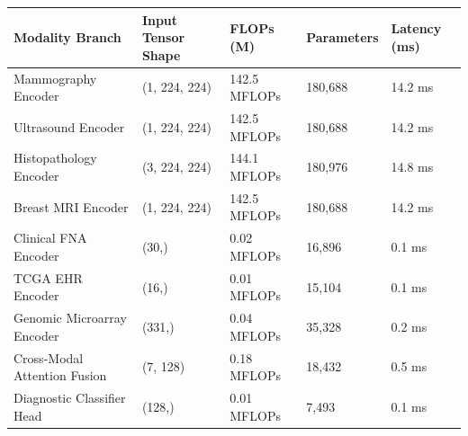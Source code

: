 \begin{tabular}{lllll}
\toprule
Modality Branch & Input Tensor Shape & FLOPs (M) & Parameters & Latency (ms) \\
\midrule
Mammography Encoder & (1, 224, 224) & 142.5 MFLOPs & 180,688 & 14.2 ms \\
Ultrasound Encoder & (1, 224, 224) & 142.5 MFLOPs & 180,688 & 14.2 ms \\
Histopathology Encoder & (3, 224, 224) & 144.1 MFLOPs & 180,976 & 14.8 ms \\
Breast MRI Encoder & (1, 224, 224) & 142.5 MFLOPs & 180,688 & 14.2 ms \\
Clinical FNA Encoder & (30,) & 0.02 MFLOPs & 16,896 & 0.1 ms \\
TCGA EHR Encoder & (16,) & 0.01 MFLOPs & 15,104 & 0.1 ms \\
Genomic Microarray Encoder & (331,) & 0.04 MFLOPs & 35,328 & 0.2 ms \\
Cross-Modal Attention Fusion & (7, 128) & 0.18 MFLOPs & 18,432 & 0.5 ms \\
Diagnostic Classifier Head & (128,) & 0.01 MFLOPs & 7,493 & 0.1 ms \\
\bottomrule
\end{tabular}
